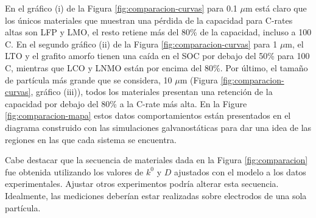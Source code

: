En el gráfico (i) de la Figura \ref{fig:comparacion-curvas} para 0.1 $\mu$m está
claro que los únicos materiales que muestran una pérdida de la capacidad para
C-rates altas son LFP y LMO, el resto retiene más del 80\% de la capacidad, 
incluso a 100 C. En el segundo gráfico (ii) de la Figura
\ref{fig:comparacion-curvas} para 1 $\mu$m, el LTO y el grafito amorfo tienen
una caída en el SOC por debajo del 50\% para 100 C, mientras que LCO y LNMO
están por encima del 80\%. Por último, el tamaño de partícula más grande que se 
considera, 10 $\mu$m (Figura \ref{fig:comparacion-curvas}, gráfico (iii)), 
todos los materiales presentan una retención de la capacidad por debajo del 80\%
a la C-rate más alta. En la Figure \ref{fig:comparacion-mapa} estos datos 
comportamientos están presentados en el diagrama construido con las simulaciones
galvanostáticas para dar una idea de las regiones en las que cada sistema se
encuentra. 

Cabe destacar que la secuencia de materiales dada en la Figura 
\ref{fig:comparacion} fue obtenida utilizando los valores de $k^0$ y $D$ 
ajustados con el modelo a los datos experimentales. Ajustar otros experimentos
podría alterar esta secuencia. Idealmente, las mediciones deberían estar 
realizadas sobre electrodos de una sola partícula.
